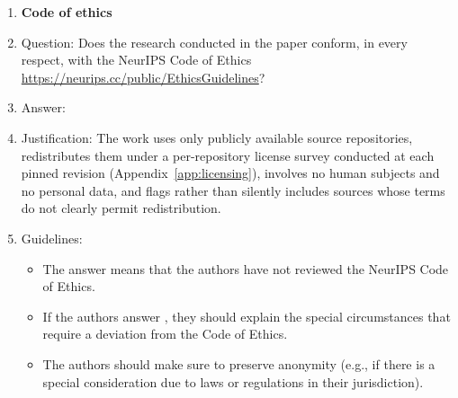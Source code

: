 \begin{enumerate}
\item {\bf Code of ethics}
    \item[] Question: Does the research conducted in the paper conform, in every respect, with the NeurIPS Code of Ethics \url{https://neurips.cc/public/EthicsGuidelines}?
    \item[] Answer: \answerYes{}
    \item[] Justification: The work uses only publicly available source repositories, redistributes them under a per-repository license survey conducted at each pinned revision (Appendix~\ref{app:licensing}), involves no human subjects and no personal data, and flags rather than silently includes sources whose terms do not clearly permit redistribution.
    \item[] Guidelines:
    \begin{itemize}
        \item The answer \answerNA{} means that the authors have not reviewed the NeurIPS Code of Ethics.
        \item If the authors answer \answerNo, they should explain the special circumstances that require a deviation from the Code of Ethics.
        \item The authors should make sure to preserve anonymity (e.g., if there is a special consideration due to laws or regulations in their jurisdiction).
    \end{itemize}



\end{enumerate}
